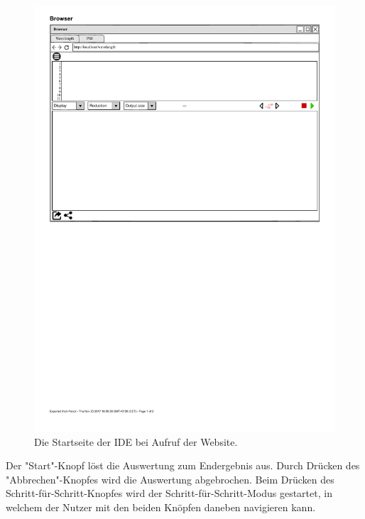 \documentclass[parskip=full,11pt,twoside]{scrartcl}
\begin{document}
\begin{figure}[H]
	\centering
	\includegraphics[width = \textwidth]{img/startseite}
	\caption{Die Startseite der IDE bei Aufruf der Website.} 
	\label{img:start}
\end{figure}


Der "Start"-Knopf löst die Auswertung zum Endergebnis aus. Durch Drücken des "Abbrechen"-Knopfes wird die Auswertung abgebrochen. Beim Drücken des Schritt-für-Schritt-Knopfes wird der Schritt-für-Schritt-Modus gestartet, in welchem der Nutzer mit den beiden Knöpfen daneben navigieren kann.
\end{document}
